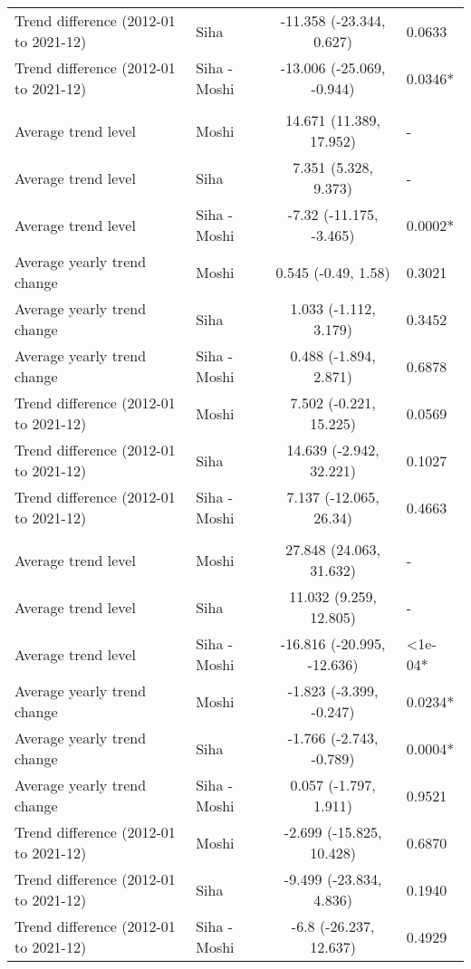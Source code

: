 \begin{longtable}{l|lcl}
Trend difference (2012-01 to 2021-12) & Siha & -11.358 (-23.344, 0.627) & 0.0633 \\ 
Trend difference (2012-01 to 2021-12) & Siha - Moshi & -13.006 (-25.069, -0.944) & 0.0346* \\ 
\midrule\addlinespace[2.5pt]
\multicolumn{4}{l}{Substance Abuse} \\[2.5pt] 
\midrule\addlinespace[2.5pt]
Average trend level & Moshi & 14.671 (11.389, 17.952) & - \\ 
Average trend level & Siha & 7.351 (5.328, 9.373) & - \\ 
Average trend level & Siha - Moshi & -7.32 (-11.175, -3.465) & 0.0002* \\ 
Average yearly trend change & Moshi & 0.545 (-0.49, 1.58) & 0.3021 \\ 
Average yearly trend change & Siha & 1.033 (-1.112, 3.179) & 0.3452 \\ 
Average yearly trend change & Siha - Moshi & 0.488 (-1.894, 2.871) & 0.6878 \\ 
Trend difference (2012-01 to 2021-12) & Moshi & 7.502 (-0.221, 15.225) & 0.0569 \\ 
Trend difference (2012-01 to 2021-12) & Siha & 14.639 (-2.942, 32.221) & 0.1027 \\ 
Trend difference (2012-01 to 2021-12) & Siha - Moshi & 7.137 (-12.065, 26.34) & 0.4663 \\ 
\midrule\addlinespace[2.5pt]
\multicolumn{4}{l}{Tuberculosis} \\[2.5pt] 
\midrule\addlinespace[2.5pt]
Average trend level & Moshi & 27.848 (24.063, 31.632) & - \\ 
Average trend level & Siha & 11.032 (9.259, 12.805) & - \\ 
Average trend level & Siha - Moshi & -16.816 (-20.995, -12.636) & <1e-04* \\ 
Average yearly trend change & Moshi & -1.823 (-3.399, -0.247) & 0.0234* \\ 
Average yearly trend change & Siha & -1.766 (-2.743, -0.789) & 0.0004* \\ 
Average yearly trend change & Siha - Moshi & 0.057 (-1.797, 1.911) & 0.9521 \\ 
Trend difference (2012-01 to 2021-12) & Moshi & -2.699 (-15.825, 10.428) & 0.6870 \\ 
Trend difference (2012-01 to 2021-12) & Siha & -9.499 (-23.834, 4.836) & 0.1940 \\ 
Trend difference (2012-01 to 2021-12) & Siha - Moshi & -6.8 (-26.237, 12.637) & 0.4929 \\ 

\end{longtable}
